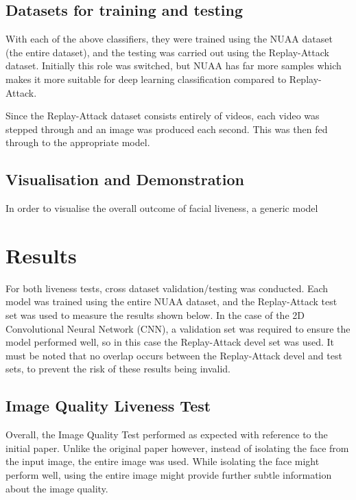 \documentclass[10pt,a4paper]{article}
\begin{document}
    \subsection{Datasets for training and testing}
            With each of the above classifiers, they were trained using the NUAA dataset (the entire dataset), and the testing was carried out using the Replay-Attack dataset.
            Initially this role was switched, but NUAA has far more samples which makes it more suitable for deep learning classification compared to Replay-Attack.

            Since the Replay-Attack dataset consists entirely of videos, each video was stepped through and an image was produced each second. This was then fed through to the appropriate model.
            

    \subsection{Visualisation and Demonstration}
        In order to visualise the overall outcome of facial liveness, a generic model 
\section{Results}
    For both liveness tests, cross dataset validation/testing was conducted. Each model was trained using the entire NUAA dataset, and the Replay-Attack test set
    was used to measure the results shown below. In the case of the 2D Convolutional Neural Network (CNN), a validation set was required to ensure the model performed
    well, so in this case the Replay-Attack devel set was used. It must be noted that no overlap occurs between the Replay-Attack devel and test sets, to prevent the risk
    of these results being invalid.

    \subsection{Image Quality Liveness Test}
        Overall, the Image Quality Test performed as expected with reference to the initial paper. Unlike the original paper however, instead of isolating the face
        from the input image, the entire image was used. While isolating the face might perform well, using the entire image might provide further subtle information
        about the image quality.
\end{document}
